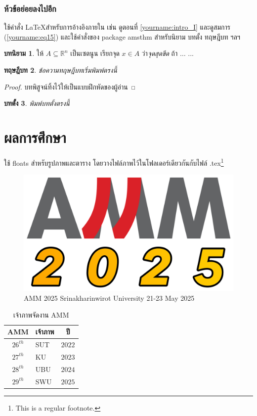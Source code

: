 \documentclass[12pt, a4paper, twoside]{article}
\theoremstyle{plain}
\newtheorem{theorem}{ทฤษฎีบท}[section]
\newtheorem{lemma}[theorem]{บทตั้ง}
\theoremstyle{definition}
\newtheorem{definition}[theorem]{บทนิยาม}
\theoremstyle{remark}
\numberwithin{equation}{section}
\begin{document}
\subsubsection{ห้วข้อย่อยลงไปอีก}
ใช้คำสั่ง \LaTeX สำหรับการอ้างอิงภายใน เช่น ดูตอนที่ \ref{yourname:intro_I} และดูสมการ (\ref{yourname:eq15}) และใช้คำสั่งของ package amsthm สำหรับนิยาม บทตั้ง ทฤษฎีบท ฯลฯ  

\begin{definition}
ให้ $A \subseteq \mathbb{R}^n$ เป็นเซตนูน  เรียกจุด $x \in A$ ว่า\emph{จุดสุดขีด} ถ้า $\dots$ ... 
\end{definition}

\begin{theorem}
	ข้อความทฤษฎีบทเริ่มพิมพ์ตรงนี้
\end{theorem}
\begin{proof}
   บทพิสูจน์ทิ้งไว้ให้เป็นแบบฝึกหัดของผู้อ่าน
\end{proof}

\begin{lemma}
	พิมพ์บทตั้งตรงนี้
\end{lemma}

\section{ผลการศึกษา}
ใช้ floats สำหรับรูปภาพและตาราง โดยวางไฟล์ภาพไว้ในโฟลเดอร์เดียวกันกับไฟล์ .tex\footnote{This is a regular footnote.}
     
\begin{figure}[h]
\centering
\includegraphics[scale=0.1]{amm2025_logo_small_color.png}
\caption{AMM 2025 Srinakharinwirot University 21-23 May 2025}
\label{yourname:ammlogo}
\end{figure}

\begin{table}[h]
\caption{เจ้าภาพจัดงาน AMM}
\begin{center}
\begin{tabular}{clc}  \hline
 AMM & เจ้าภาพ & ปี\\ \hline\hline
 $26^{th}$ & SUT &$2022$ \\ 
$27^{th}$ & KU  &$2023$ \\ 
$28^{th}$ & UBU &$2024$ \\ 
$29^{th}$ & SWU &$2025$ \\ 	 
\hline
\end{tabular}
\label{yourname:tableofamm}
\end{center}
\end{table}
\end{document}
